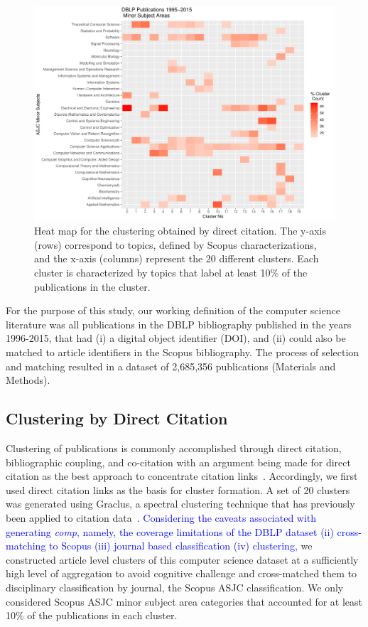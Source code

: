 \begin{figure}[ht]
  \includegraphics[scale=0.45]{scopus_dblp_graclus3.pdf}
\caption{Heat map for the clustering obtained by direct citation. The  y-axis (rows) correspond to topics, defined by Scopus characterizations, and the
x-axis (columns) represent the 20 different clusters.  
Each cluster is characterized by topics that label at least 10\% of the publications in the cluster.
 }
\label{fig:heatmap}       %
\end{figure}

For the purpose of this study, our working definition of the computer science literature was all publications in the DBLP bibliography published in the years 1996-2015, that had (i) a digital object identifier (DOI), and (ii) could also be matched to article identifiers in the Scopus bibliography. The process of selection and matching resulted in a dataset of 2,685,356 publications (Materials and Methods). 

\subsection{Clustering by Direct Citation} 
Clustering of publications is commonly accomplished through direct citation, bibliographic coupling, and co-citation with an argument being made for direct citation as the best approach to concentrate citation links~\cite{klavans_which_2017}. Accordingly, we first used direct citation links as the basis for cluster formation. A set of 20 clusters was generated using Graclus, a spectral clustering technique that has previously been applied to citation data~\cite{graclus_2007,subelj_clustering_2016}. 
\textcolor{blue}{
Considering the caveats associated with generating \emph{comp}, namely, the coverage limitations of the DBLP dataset (ii) cross-matching to Scopus (iii) journal based classification (iv) clustering, }
we constructed article level clusters of this computer science dataset at a sufficiently high level of aggregation to avoid cognitive challenge and cross-matched them to disciplinary classification by journal, the Scopus ASJC classification. We only considered Scopus ASJC minor subject area categories that accounted for at least 10\% of the publications in each cluster. 

